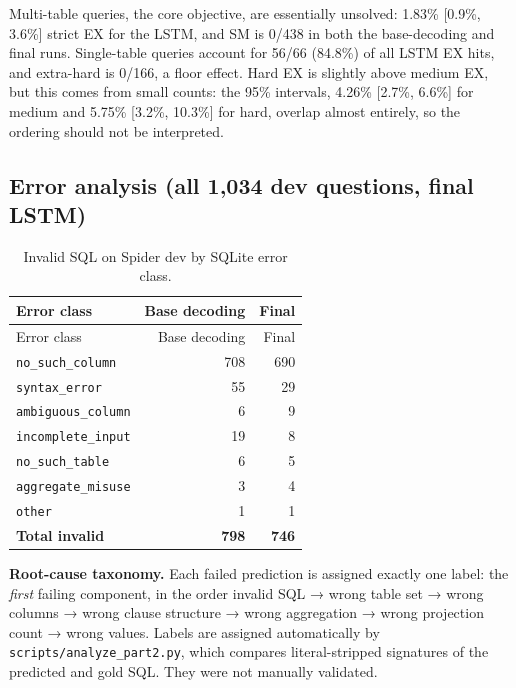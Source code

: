 \documentclass[
  10pt,
]{article}
\begin{document}
Multi-table queries, the core objective, are essentially unsolved:
1.83\% {[}0.9\%, 3.6\%{]} strict EX for the LSTM, and SM is 0/438 in
both the base-decoding and final runs. Single-table queries account for
56/66 (84.8\%) of all LSTM EX hits, and extra-hard is 0/166, a floor
effect. Hard EX is slightly above medium EX, but this comes from small
counts: the 95\% intervals, 4.26\% {[}2.7\%, 6.6\%{]} for medium and
5.75\% {[}3.2\%, 10.3\%{]} for hard, overlap almost entirely, so the
ordering should not be interpreted.

\subsection{Error analysis (all 1,034 dev questions, final
LSTM)}\label{error-analysis-all-1034-dev-questions-final-lstm}

\begin{longtable}[]{@{}lrr@{}}
\caption{Invalid SQL on Spider dev by SQLite error
class.}\tabularnewline
\toprule\noalign{}
Error class & Base decoding & Final \\
\midrule\noalign{}
\endfirsthead
\toprule\noalign{}
Error class & Base decoding & Final \\
\midrule\noalign{}
\endhead
\bottomrule\noalign{}
\endlastfoot
\texttt{no\_such\_column} & 708 & 690 \\
\texttt{syntax\_error} & 55 & 29 \\
\texttt{ambiguous\_column} & 6 & 9 \\
\texttt{incomplete\_input} & 19 & 8 \\
\texttt{no\_such\_table} & 6 & 5 \\
\texttt{aggregate\_misuse} & 3 & 4 \\
\texttt{other} & 1 & 1 \\
\textbf{Total invalid} & \textbf{798} & \textbf{746} \\
\end{longtable}

\textbf{Root-cause taxonomy.} Each failed prediction is assigned exactly
one label: the \emph{first} failing component, in the order invalid SQL
→ wrong table set → wrong columns → wrong clause structure → wrong
aggregation → wrong projection count → wrong values. Labels are assigned
automatically by \texttt{scripts/analyze\_part2.py}, which compares
literal-stripped signatures of the predicted and gold SQL. They were not
manually validated.
\end{document}
